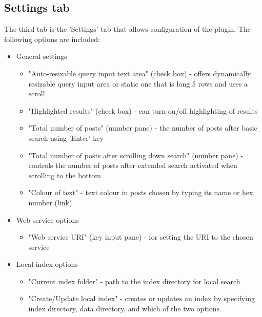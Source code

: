 \documentclass{l4proj}
\begin{document}
\subsection{Settings tab}
The third tab is the 'Settings' tab that allows configuration of the plugin. The following options are included:\\

\begin{itemize}

\item General settings
\begin{itemize}
\item "Auto-resizable query input text area" (check box) - offers dynamically resizable query input area or static one that is long 5 rows and uses a scroll 
\item "Highlighted results" (check box) - can turn on/off highlighting of results
\item "Total number of posts" (number pane) - the number of posts after basic search using 'Enter' key
\item "Total number of posts after scrolling down search" (number pane) - controls the number of posts after extended search activated when scrolling to the bottom
\item "Colour of text" - text colour in posts chosen by typing its name or hex number (link)
\end{itemize}

\item Web service options
\begin{itemize}
\item "Web service URI" (key input pane) - for setting the URI to the chosen service
\end{itemize}

\item Local index options
\begin{itemize}
\item "Current index folder" - path to the index directory for local search
\item "Create/Update local index" - creates or updates an index by specifying index directory, data directory, and which of the two options.
\end{itemize}

\end{itemize}
\end{document}
